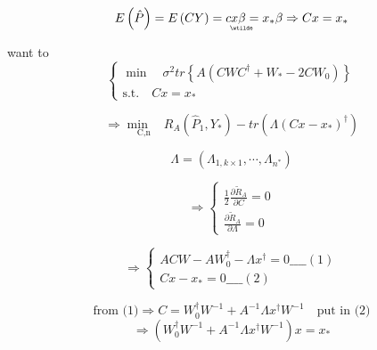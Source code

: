 \documentclass{article}
\begin{document}
\begin{equation*}
E\left( \hat{P}\right) =E\left( CY\right) =cx%
\underaccent{\wtilde}{\beta}%
=x_{\ast }\beta \Rightarrow Cx=x_{\ast }
\end{equation*}

want to%
\begin{equation*}
\left\{ 
\begin{array}{c}
\min \quad \sigma ^{2}tr\left\{ A\left( CWC^{\dagger }+W_{\ast
}-2CW_{0}\right) \right\}  \\ 
\text{s.t.}\quad Cx=x_{\ast }%
\end{array}%
\right. 
\end{equation*}

\begin{equation*}
\Rightarrow \underset{\text{C,n}}{\min \quad }R_{A}\left( \hat{P}%
_{1},Y_{\ast }\right) -tr\left( \Lambda \left( Cx-x_{\ast }\right) ^{\dagger
}\right) 
\end{equation*}

\begin{equation*}
\Lambda =\left( \Lambda _{1,k\times 1},\cdots ,\Lambda _{n^{\ast }}\right) 
\end{equation*}

\begin{equation*}
\Rightarrow \left\{ 
\begin{array}{c}
\frac{1}{2}\frac{\partial \tilde{R}_{A}}{\partial C}=0 \\ 
\frac{\partial \tilde{R}_{A}}{\partial \Lambda }=0%
\end{array}%
\right. 
\end{equation*}

\begin{equation*}
\Rightarrow \left\{ 
\begin{array}{c}
ACW-AW_{0}^{\dagger }-\Lambda x^{\dagger }=0\_\_\_\_\left( 1\right)  \\ 
Cx-x_{\ast }=0\_\_\_\_\left( 2\right) 
\end{array}%
\right. 
\end{equation*}

\begin{equation*}
\text{from (1)}\Rightarrow C=W_{0}^{\dagger }W^{-1}+A^{-1}\Lambda x^{\dagger
}W^{-1}\quad \text{put in (2)}
\end{equation*}%
\begin{equation*}
\Rightarrow \left( W_{0}^{\dagger }W^{-1}+A^{-1}\Lambda x^{\dagger
}W^{-1}\right) x=x_{\ast }
\end{equation*}
\end{document}
